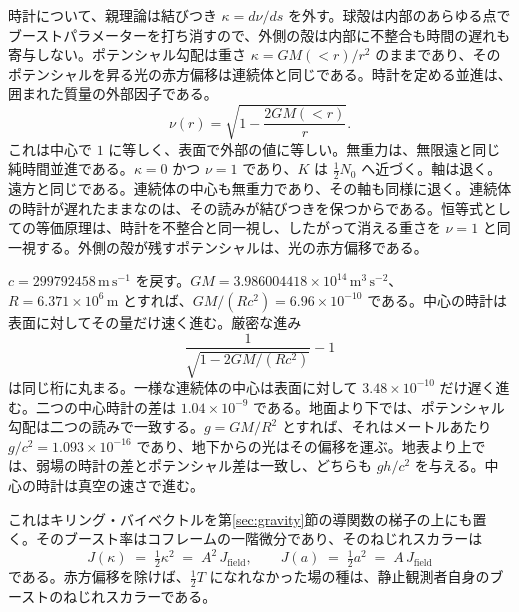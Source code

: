 \documentclass[a4paper]{article}
\begin{document}
時計について、親理論は結びつき \(\kappa=d\nu/ds\) を外す。球殻は内部のあらゆる点でブーストパラメーターを打ち消すので、外側の殻は内部に不整合も時間の遅れも寄与しない。ポテンシャル勾配は重さ \(\kappa=GM(<r)/r^{2}\) のままであり、そのポテンシャルを昇る光の赤方偏移は連続体と同じである。時計を定める並進は、囲まれた質量の外部因子である。
\begin{equation}
\label{eq:interior-clock}
\nu(r)=\sqrt{1-\frac{2GM(<r)}{r}}.
\end{equation}
これは中心で \(1\) に等しく、表面で外部の値に等しい。無重力は、無限遠と同じ純時間並進である。\(\kappa=0\) かつ \(\nu=1\) であり、\(K\) は \(\tfrac12 N_{0}\) へ近づく。軸は退く。遠方と同じである。連続体の中心も無重力であり、その軸も同様に退く。連続体の時計が遅れたままなのは、その読みが結びつきを保つからである。恒等式としての等価原理は、時計を不整合と同一視し、したがって消える重さを \(\nu=1\) と同一視する。外側の殻が残すポテンシャルは、光の赤方偏移である。

\(c=299792458\,\mathrm{m\,s^{-1}}\) を戻す。\(GM=3.986004418\times 10^{14}\,\mathrm{m^{3}\,s^{-2}}\)、\(R=6.371\times 10^{6}\,\mathrm{m}\) とすれば、\(GM/(Rc^{2})=6.96\times 10^{-10}\) である。中心の時計は表面に対してその量だけ速く進む。厳密な進み
\[
\frac{1}{\sqrt{1-2GM/(Rc^{2})}}-1
\]
は同じ桁に丸まる。一様な連続体の中心は表面に対して \(3.48\times 10^{-10}\) だけ遅く進む。二つの中心時計の差は \(1.04\times 10^{-9}\) である。地面より下では、ポテンシャル勾配は二つの読みで一致する。\(g=GM/R^{2}\) とすれば、それはメートルあたり \(g/c^{2}=1.093\times 10^{-16}\) であり、地下からの光はその偏移を運ぶ。地表より上では、弱場の時計の差とポテンシャル差は一致し、どちらも \(gh/c^{2}\) を与える。中心の時計は真空の速さで進む。

これはキリング・バイベクトルを第\ref{sec:gravity}節の導関数の梯子の上にも置く。そのブースト率はコフレームの一階微分であり、そのねじれスカラーは
\[
J(\kappa) \;=\; \tfrac12\kappa^{2} \;=\; A^{2}\,J_{\mathrm{field}},
\qquad
J(a) \;=\; \tfrac12 a^{2} \;=\; A\,J_{\mathrm{field}}
\]
である。赤方偏移を除けば、\(\tfrac12T\) になれなかった場の種は、静止観測者自身のブーストのねじれスカラーである。
\end{document}
